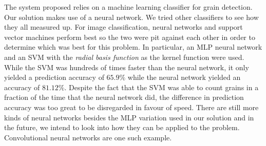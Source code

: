 The system proposed relies on a machine learning classifier for grain detection. Our solution makes use of a neural network. We tried other classifiers to see how they all measured up. For image classification, neural networks and support vector machines perform best so the two were pit against each other in order to determine which was best for this problem. In particular, an MLP neural network and an SVM with the \textit{radial basis function} as the kernel function were used. While the SVM was hundreds of times faster than the neural network, it only yielded a prediction accuracy of $65.9\%$ while the neural network yielded an accuracy of $81.12\%$. Despite the fact that the SVM was able to count grains in a fraction of the time that the neural network did, the difference in prediction accuracy was too great to be disregarded in favour of speed. There are still more kinds of neural networks besides the MLP variation used in our solution and in the future, we intend to look into how they can be applied to the problem. Convolutional neural networks are one such example. 



\bigskip





